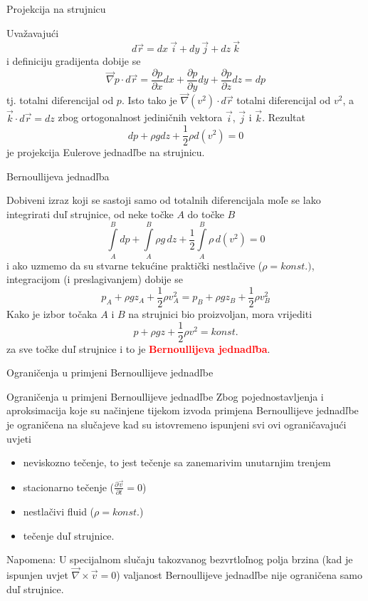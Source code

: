 \documentclass[croatian]{beamer}
\begin{document}
\begin{frame}{Projekcija na strujnicu}

Uvažavajući 
\[
d\vec{r}=dx\:\vec{i}+dy\:\vec{j}+dz\:\vec{k}
\]
i definiciju gradijenta dobije se 
\[
\vec{\nabla}p\cdot d\vec{r}=\frac{\partial p}{\partial x}dx+\frac{\partial p}{\partial y}dy+\frac{\partial p}{\partial z}dz=dp
\]
tj. totalni diferencijal od $p$. Isto tako je $\vec{\nabla}(v^{2})\cdot d\vec{r}$
totalni diferencijal od $v^{2}$, a $\vec{k}\cdot d\vec{r}=dz$ zbog
ortogonalnost jediničnih vektora $\vec{i}$, $\vec{j}$ i $\vec{k}$.
Rezultat 
\[
dp+\rho gdz+\frac{1}{2}\rho d(v^{2})=0
\]
je projekcija Eulerove jednadľbe na strujnicu.
\end{frame}

\begin{frame}{Bernoullijeva jednadľba}

Dobiveni izraz koji se sastoji samo od totalnih diferencijala moľe
se lako integrirati duľ strujnice, od neke točke $A$ do točke $B$
\[
\int\limits _{A}^{B}dp+\int\limits _{A}^{B}\rho g\,dz+\frac{1}{2}\int\limits _{A}^{B}\rho\,d(v^{2})=0
\]
i ako uzmemo da su stvarne tekućine praktički nestlačive ($\rho=konst.)$,
integracijom (i preslagivanjem) dobije se 
\[
p_{{\scriptscriptstyle A}}+\rho gz_{{\scriptscriptstyle A}}+\frac{1}{2}\rho v_{{\scriptscriptstyle A}}^{2}=p_{{\scriptscriptstyle B}}+\rho gz_{{\scriptscriptstyle B}}+\frac{1}{2}\rho v_{{\scriptscriptstyle B}}^{2}
\]
Kako je izbor točaka $A$ i $B$ na strujnici bio proizvoljan, mora
vrijediti 
\[
p+\rho gz+\frac{1}{2}\rho v^{2}=konst.
\]
za sve točke duľ strujnice i to je \textbf{\textcolor{red}{Bernoullijeva
jednadľba}}.
\end{frame}

\begin{frame}{Ograničenja u primjeni Bernoullijeve jednadľbe}

\begin{alertblock}{Ograničenja u primjeni Bernoullijeve jednadľbe}
Zbog pojednostavljenja i aproksimacija koje su načinjene tijekom
izvoda primjena Bernoullijeve jednadľbe je ograničena na slučajeve
kad su istovremeno ispunjeni svi ovi ograničavajući uvjeti 

\begin{itemize}
\item neviskozno tečenje, to jest tečenje sa zanemarivim unutarnjim trenjem 
\item stacionarno tečenje ($\frac{\partial\vec{v}}{\partial t}=0$) 
\item nestlačivi fluid ($\rho=konst.$) 
\item tečenje duľ strujnice. 
\end{itemize}

\end{alertblock}
Napomena: U specijalnom slučaju takozvanog bezvrtloľnog polja brzina
(kad je ispunjen uvjet $\vec{\nabla}\times\vec{v}=0$) valjanost Bernoullijeve
jednadľbe nije ograničena samo duľ strujnice.
\end{frame}
\end{document}

